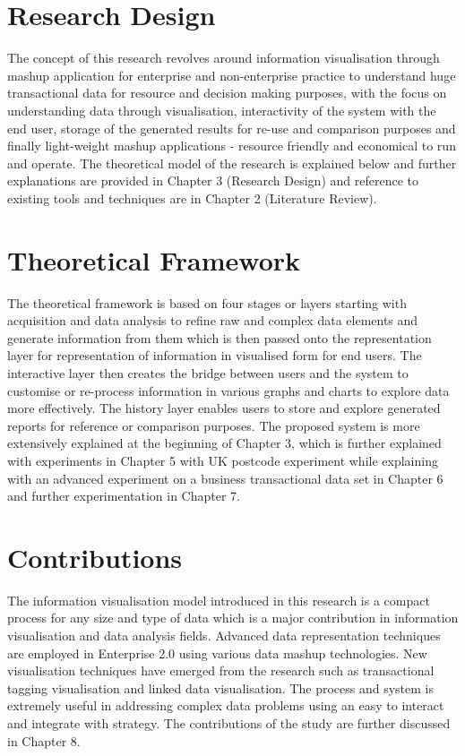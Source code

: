 \section{Research Design}

The concept of this research revolves around information visualisation through mashup application for enterprise and non-enterprise practice to understand huge transactional data for resource and decision making purposes, with the focus on understanding data through visualisation, interactivity of the system with the end user, storage of the generated results for re-use and comparison purposes and finally light-weight mashup applications - resource friendly and economical to run and operate. The theoretical model of the research is explained below and further explanations are provided in Chapter 3 (Research Design) and reference to existing tools and techniques are in Chapter 2 (Literature Review).

\section{Theoretical Framework}

The theoretical framework is based on four stages or layers starting with acquisition and data analysis to refine raw and complex data elements and generate information from them which is then passed onto the representation layer for representation of information in visualised form for end users. The interactive layer then creates the bridge between users and the system to customise or re-process information in various graphs and charts to explore data more effectively. The history layer enables users to store and explore generated reports for reference or comparison purposes. The proposed system is more extensively explained at the beginning of Chapter 3, which is further explained with experiments in Chapter 5 with UK postcode experiment while explaining with an advanced experiment on a business transactional data set in Chapter 6 and further experimentation in Chapter 7.

\section{Contributions}

The information visualisation model introduced in this research is a compact process for any size and type of data which is a major contribution in information visualisation and data analysis fields. Advanced data representation techniques are employed in Enterprise 2.0 using various data mashup technologies. New visualisation techniques have emerged from the research such as transactional tagging visualisation and linked data visualisation. The process and system is extremely useful in addressing complex data problems using an easy to interact and integrate with strategy. The contributions of the study are further discussed in Chapter 8.

